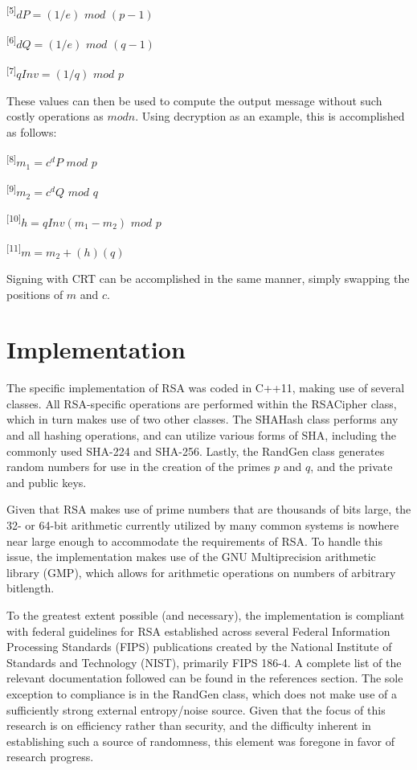 \documentclass[journal]{IEEEtran}
\begin{document}
\textsuperscript{[5]}$dP = (1/e)$ $mod$ $(p - 1)$

\textsuperscript{[6]}$dQ = (1/e)$ $mod$ $(q - 1)$

\textsuperscript{[7]}$qInv = (1/q)$ $mod$ $p$

These values can then be used to compute the output message without such costly operations as $mod n$. Using decryption as an example, this is accomplished as follows:\newline

\textsuperscript{[8]}$m_1 = c^dP$ $mod$ $p$

\textsuperscript{[9]}$m_2 = c^dQ$ $mod$ $q$

\textsuperscript{[10]}$h = qInv(m_1 - m_2)$ $mod$ $p$

\textsuperscript{[11]}$m = m_2 + (h)(q)$
\newline 

Signing with CRT can be accomplished in the same manner, simply swapping the positions of $m$ and $c$.

\section{Implementation}
The specific implementation of RSA was coded in C++11, making use of several classes. All RSA-specific operations are performed within the RSACipher class, which in turn makes use of two other classes. The SHAHash class performs any and all hashing operations, and can utilize various forms of SHA, including the commonly used SHA-224 and SHA-256. Lastly, the RandGen class generates random numbers for use in the creation of the primes $p$ and $q$, and the private and public keys.

Given that RSA makes use of prime numbers that are thousands of bits large, the 32- or 64-bit arithmetic currently utilized by many common systems is nowhere near large enough to accommodate the requirements of RSA. To handle this issue, the implementation makes use of the GNU Multiprecision arithmetic library (GMP), which allows for arithmetic operations on numbers of arbitrary bitlength. 

To the greatest extent possible (and necessary), the implementation is compliant with federal guidelines for RSA established across several Federal Information Processing Standards (FIPS) publications created by the National Institute of Standards and Technology (NIST), primarily FIPS 186-4. A complete list of the relevant documentation followed can be found in the references section. The sole exception to compliance is in the RandGen class, which does not make use of a sufficiently strong external entropy/noise source. Given that the focus of this research is on efficiency rather than security, and the difficulty inherent in establishing such a source of randomness, this element was foregone in favor of research progress.
\end{document}
